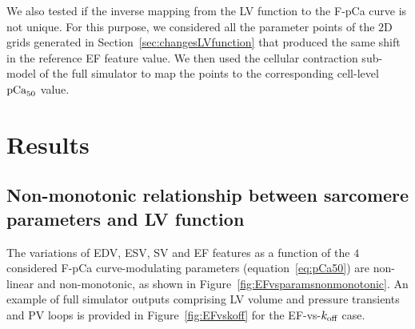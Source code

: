 \vspace{0.2cm}
We also tested if the inverse mapping from the LV function to the F-pCa curve is not unique. For this purpose, we considered all the parameter points of the $2$D grids generated in Section~\ref{sec:changesLVfunction} that produced the same shift in the reference EF feature value. We then used the cellular contraction sub-model of the full simulator to map the points to the corresponding cell-level $\textrm{pCa}_{50}$ value.


%
%
%
\section{Results}


%
%
%
\subsection{Non-monotonic relationship between sarcomere parameters and LV function}
The variations of EDV, ESV, SV and EF features as a function of the $4$ considered F-pCa curve-modulating parameters (equation~\eqref{eq:pCa50}) are non-linear and non-monotonic, as shown in Figure~\ref{fig:EFvsparamsnonmonotonic}. An example of full simulator outputs comprising LV volume and pressure transients and PV loops is provided in Figure~\ref{fig:EFvskoff} for the EF-vs-$k_{\textrm{off}}$ case.

